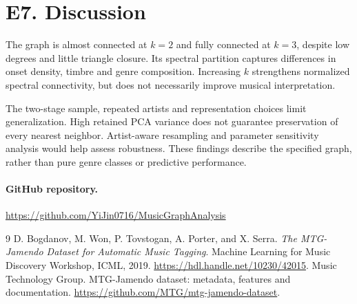 \documentclass[11pt,letterpaper]{article}
\begin{document}
\section*{E7. Discussion}

The graph is almost connected at $k=2$ and fully connected at $k=3$, despite
low degrees and little triangle closure. Its spectral partition captures
differences in onset density, timbre and genre composition. Increasing $k$
strengthens normalized spectral connectivity, but does not necessarily improve
musical interpretation.

The two-stage sample, repeated artists and representation choices limit
generalization. High retained PCA variance does not guarantee preservation
of every nearest neighbor. Artist-aware resampling and parameter sensitivity
analysis would help assess robustness. These findings describe the specified
graph, rather than pure genre classes or predictive performance.

\paragraph{GitHub repository.}
\url{https://github.com/YiJin0716/MusicGraphAnalysis}

\begin{thebibliography}{9}
D. Bogdanov, M. Won, P. Tovstogan, A. Porter, and X. Serra.
\emph{The MTG-Jamendo Dataset for Automatic Music Tagging}.
Machine Learning for Music Discovery Workshop, ICML, 2019.
\url{https://hdl.handle.net/10230/42015}.
Music Technology Group. MTG-Jamendo dataset: metadata, features and documentation.
\url{https://github.com/MTG/mtg-jamendo-dataset}.
\end{thebibliography}
\end{document}
